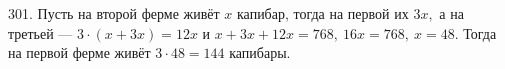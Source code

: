 301. Пусть на второй ферме живёт $x$ капибар, тогда на первой их $3x,$ а на третьей --- $3\cdot(x+3x)=12x$ и $x+3x+12x=768,\ 16x=768,\ x=48.$ Тогда на первой ферме живёт $3\cdot48=144$ капибары.\\
